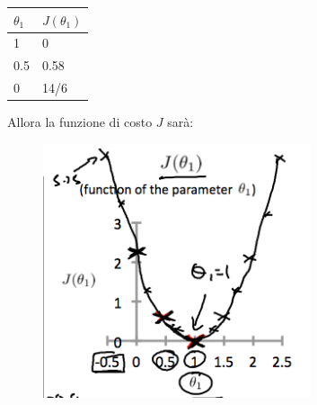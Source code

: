 \begin{esempio}
\begin{table}[H]
\centering
\begin{tabular}{|l|l|}
\hline
{\color[HTML]{FE0000} \textit{$\theta_1$}} & {\color[HTML]{FE0000} \textit{$J(\theta_1)$}} \\ \hline
1                                          & 0                                    \\ \hline
0.5                                        & 0.58                                 \\ \hline
0                                          & 14/6                                 \\ \hline
\end{tabular}
\end{table}
Allora la funzione di costo $J$ sarà:
\begin{figure}[h!]
    \centering
    \includegraphics[width=0.7\textwidth]{img/fph0S5tTEeajtg5TyD0vYA_9b28bdfeb34b2d4914d0b64903735cf1_Screenshot-2016-10-26-01.09.05.png}
\end{figure}
\end{esempio}
